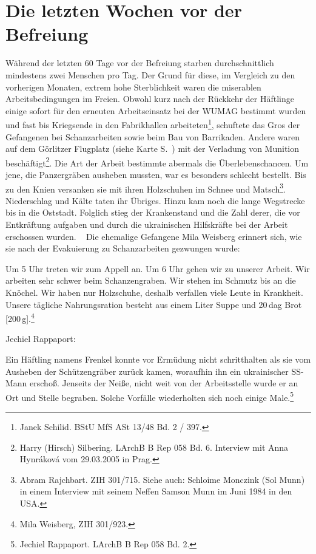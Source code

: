 \newpage

 
\section{Die letzten Wochen vor der Befreiung}

Während der letzten 60 Tage vor der Befreiung starben durchschnittlich mindestens zwei Menschen pro Tag. Der Grund für diese, im Vergleich zu den vorherigen Monaten, extrem hohe Sterblichkeit waren die miserablen Arbeitsbedingungen im Freien. Obwohl kurz nach der Rückkehr der Häftlinge einige sofort für den erneuten Arbeitseinsatz bei der WUMAG bestimmt wurden und fast bis Kriegsende in den Fabrikhallen arbeiteten\footnote{Janek Schilid. BStU MfS ASt 13/48 Bd. 2 / 397.}, schuftete das Gros der Gefangenen bei Schanzarbeiten sowie beim Bau von Barrikaden. Andere waren auf dem Görlitzer Flugplatz (siehe Karte S.~\pageref{map_goerlitz}) mit der Verladung von Munition beschäftigt\footnote{Harry (Hirsch) Silbering. LArchB B Rep 058 Bd. 6. Interview mit Anna Hynr\'akov\'a vom 29.03.2005 in Prag.}.
\newline
Die Art der Arbeit bestimmte abermals die Überlebenschancen. Um jene, die Panzergräben ausheben mussten, war es besonders schlecht bestellt. Bis zu den Knien versanken sie mit ihren Holzschuhen im Schnee und Matsch\footnote{Abram Rajchbart. ZIH 301/715. Siehe auch: Schloime Monczink (Sol Munn) in einem Interview mit seinem Neffen Samson Munn im Juni 1984 in den USA.}. Niederschlag und Kälte taten ihr Übriges. Hinzu kam noch die lange Wegstrecke bis in die Oststadt. Folglich stieg der Krankenstand und die Zahl derer, die vor Entkräftung aufgaben und durch die ukrainischen Hilfskräfte bei der Arbeit erschossen wurden. 
~\newline
Die ehemalige Gefangene Mila Weisberg erinnert sich, wie sie nach der Evakuierung zu Schanzarbeiten gezwungen wurde: 
\begin{leftbar} 
Um 5 Uhr treten wir zum Appell an. Um 6 Uhr gehen wir zu unserer Arbeit. Wir arbeiten sehr schwer beim Schanzengraben. Wir stehen im Schmutz bis an die Knöchel. Wir haben nur Holzschuhe, deshalb verfallen viele Leute in Krankheit. Unsere tägliche Nahrungsration besteht aus einem Liter Suppe und 20\,dag Brot [200\,g].\footnote{Mila Weisberg, ZIH 301/923.}
\end{leftbar}
Jechiel Rappaport:
\begin{leftbar} 
Ein Häftling namens Frenkel konnte vor Ermüdung nicht schritthalten als sie vom Ausheben der Schützengräber zurück kamen, woraufhin ihn ein ukrainischer SS-Mann erschoß. Jenseits der Neiße, nicht weit von der Arbeitsstelle wurde er an Ort und Stelle begraben. Solche Vorfälle wiederholten sich noch einige Male.\footnote{Jechiel Rappaport. LArchB B Rep 058 Bd. 2.}
\end{leftbar}



